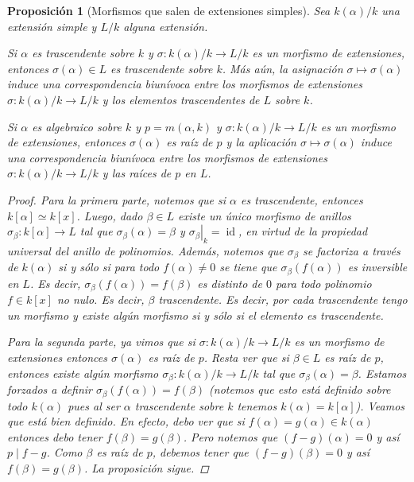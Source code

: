 \documentclass[12pt]{book}
\newtheorem{prop}[teo]{Proposición}
\theoremstyle{definition}
\DeclareMathOperator{\id}{id}
\begin{document}
\begin{prop}[Morfismos que salen de extensiones simples]
Sea $k(\alpha)/k$ una extensión simple y $L/k$ alguna extensión.

Si $\alpha$ es trascendente sobre $k$ y $\sigma:k(\alpha)/k\to L/k$ es un morfismo de extensiones, entonces $\sigma(\alpha)\in L$ es trascendente sobre $k$. Más aún, la asignación $\sigma\mapsto\sigma(\alpha)$ induce una correspondencia biunívoca entre los morfismos de extensiones $\sigma:k(\alpha)/k\to L/k$ y los elementos trascendentes de $L$ sobre $k$.

Si $\alpha$ es algebraico sobre $k$ y $p=m(\alpha,k)$ y $\sigma:k(\alpha)/k\to L/k$ es un morfismo de extensiones, entonces $\sigma(\alpha)$ es raíz de $p$ y la aplicación $\sigma\mapsto \sigma(\alpha)$ induce una correspondencia biunívoca entre los morfismos de extensiones $\sigma:k(\alpha)/k\to L/k$ y las raíces de $p$ en $L$.
\begin{proof}
Para la primera parte, notemos que si $\alpha$ es trascendente, entonces $k[\alpha]\simeq k[x]$. Luego, dado $\beta\in L$ existe un único morfismo de anillos $\sigma_\beta: k[\alpha]\to L$ tal que $\sigma_\beta(\alpha)=\beta$ y $\left.\sigma_\beta\right|_{k}=\id$, en virtud de la propiedad universal del anillo de polinomios. Además, notemos que $\sigma_\beta$ se factoriza a través de $k(\alpha)$ si y sólo si para todo $f(\alpha)\neq 0$ se tiene que $\sigma_\beta(f(\alpha))$ es inversible en $L$. Es decir, $\sigma_\beta(f(\alpha))=f(\beta)$ es distinto de $0$ para todo polinomio $f\in k[x]$ no nulo. Es decir, $\beta$ trascendente.
Es decir, por cada trascendente tengo un morfismo y existe algún morfismo si y sólo si el elemento es trascendente.

Para la segunda parte, ya vimos que si $\sigma:k(\alpha)/k\to L/k$ es un morfismo de extensiones entonces $\sigma(\alpha)$ es raíz de $p$. Resta ver que si $\beta\in L$ es raíz de $p$, entonces existe algún morfismo $\sigma_\beta:k(\alpha)/k\to L/k$ tal que $\sigma_\beta(\alpha)=\beta$. Estamos forzados a definir $\sigma_\beta(f(\alpha))=f(\beta)$ (notemos que esto está definido sobre todo $k(\alpha)$ pues al ser $\alpha$ trascendente sobre $k$ tenemos $k(\alpha)=k[\alpha]$). Veamos que está bien definido. En efecto, debo ver que si $f(\alpha)=g(\alpha)\in k(\alpha)$ entonces debo tener $f(\beta)=g(\beta)$. Pero notemos que $(f-g)(\alpha)=0$ y así $p\mid f-g$. Como $\beta$ es raíz de $p$, debemos tener que $(f-g)(\beta)=0$ y así $f(\beta)=g(\beta)$. La proposición sigue.
\end{proof}
\end{prop}
\end{document}
